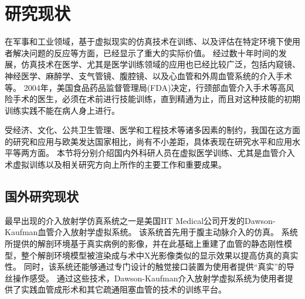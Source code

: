 \section{研究现状}
\label{sec1-4}


在军事和工业领域，基于虚拟现实的仿真技术在训练、以及评估在特定环境下使用者解决问题的反应等方面，已经显示了重大的实际价值\cite{Goodwin1978Simulator}\cite{Rolfe1986Simulators}\cite{Ressler1999Simulators}\cite{Wachtel1985Simulators}\cite{Liu2013Military}。
经过数十年时间的发展\cite{Dawson1998}，仿真技术在医学、尤其是医学训练领域的应用也已经比较广泛，包括内窥镜\cite{Vining1995Endoscopy}\cite{Preminger1996Endoscopy}、神经医学\cite{Kockro2000Neurosurgery}\cite{Cotin2005EVE}\cite{Ma2007NeuroCath}、麻醉学\cite{Gaba1988Anesthesiology}、支气管镜\cite{Vining1996Bronchoscopy}、腹腔镜\cite{Hon1994Laparoscopy}\cite{Derossis1998Laparoscopy}、以及心血管和外周血管系统的介入手术\cite{Chui1998ICard}\cite{Cotin2000ICTS}\cite{Tan2012NUDT}等。
2004年，美国食品药品监督管理局(FDA)决定，行颈部血管介入手术等高风险手术的医生，必须在术前进行技能训练，直到精通为止，而且对这种技能的初期训练实践不能在病人身上进行\cite{Dawson2006Medicine}。

受经济、文化、公共卫生管理、医学和工程技术等诸多因素的制约，我国在这方面的研究和应用与欧美发达国家相比，尚有不小差距，具体表现在研究水平和应用水平等两方面。
本节将分别介绍国内外科研人员在虚拟医学训练、尤其是血管介入术虚拟训练以及相关研究方向上所作的主要工作和重要成果。

\subsection{国外研究现状}
\label{sec1-4-1}

最早出现的介入放射学仿真系统之一是美国HT Medical公司开发的Dawson-Kaufman血管介入放射学虚拟系统\cite{Higgins1995DK}\cite{Dawson1996DK}\cite{meglan1996DK}。
该系统首先用于腹主动脉介入的仿真\cite{Wang1998ICard}。
系统所提供的解剖环境基于真实病例的影像，并在此基础上重建了血管的静态刚性模型，整个解剖环境模型被渲染成与术中X光影像类似的显示效果以提高仿真的真实性\cite{Higgins1995DK}。
同时，该系统还能够通过专门设计的触觉接口装置为使用者提供“真实”的导丝操作感受\cite{BroNielsen1997DK}。
通过这些技术，Dawson-Kaufman介入放射学虚拟系统为使用者提供了实践血管成形术和其它疏通阻塞血管的技术的训练平台。

